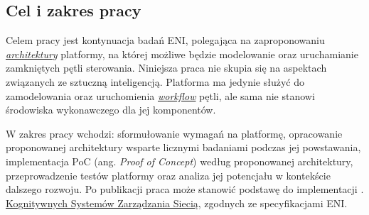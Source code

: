 \subsection{Cel i zakres pracy}

Celem pracy jest kontynuacja badań ENI, polegająca na zaproponowaniu \hyperlink{def:architektura}{\textit{architektury}} platformy, na której możliwe będzie modelowanie oraz uruchamianie zamkniętych pętli sterowania. Niniejsza praca nie skupia się na aspektach związanych ze sztuczną inteligencją. Platforma ma jedynie służyć do zamodelowania oraz uruchomienia \hyperlink{def:workflow}{\textit{workflow}} pętli, ale sama nie stanowi środowiska wykonawczego dla jej komponentów. 

W zakres pracy wchodzi: sformułowanie wymagań na platformę, opracowanie proponowanej architektury wsparte licznymi badaniami podczas jej powstawania, implementacja PoC (ang. \textit{Proof of Concept}) według proponowanej architektury, przeprowadzenie testów platformy oraz analiza jej potencjału w kontekście dalszego rozwoju. Po publikacji praca może stanowić podstawę do implementacji . \hyperlink{def:kognitywny-system-zarzadzania-siecia}{Kognitywnych Systemów Zarządzania Siecią}, zgodnych ze specyfikacjami ENI. 